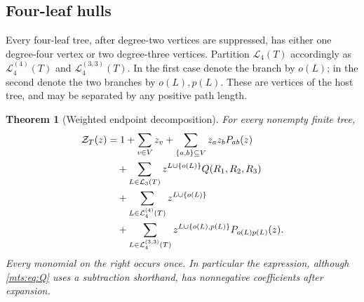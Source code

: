 \documentclass[11pt]{article}
\numberwithin{equation}{section}
\newtheorem{theorem}{Theorem}[section]
\theoremstyle{definition}
\newcommand{\Zpoly}{\mathcal Z}
\begin{document}
\subsection{Four-leaf hulls}

Every four-leaf tree, after degree-two vertices are suppressed, has either
one degree-four vertex or two degree-three vertices. Partition
$\mathcal L_4(T)$ accordingly as $\mathcal L_4^{(4)}(T)$ and
$\mathcal L_4^{(3,3)}(T)$. In the first case denote the branch by $o(L)$;
in the second denote the two branches by $o(L),p(L)$. These are vertices
of the host tree, and may be separated by any positive path length.

\begin{theorem}[Weighted endpoint decomposition]\label{mts:thm:enumerator}
For every nonempty finite tree,
\begin{align}
 \Zpoly_T(z)
 &=1+\sum_{v\in V}z_v
   +\sum_{\{a,b\}\subseteq V}z_a z_b P_{ab}(z)\notag\\
 &\quad+\sum_{L\in\mathcal L_3(T)}
            z^{L\cup\{o(L)\}}Q(R_1,R_2,R_3)\notag\\
 &\quad+\sum_{L\in\mathcal L_4^{(4)}(T)}z^{L\cup\{o(L)\}}\notag\\
 &\quad+\sum_{L\in\mathcal L_4^{(3,3)}(T)}
            z^{L\cup\{o(L),p(L)\}}P_{o(L)p(L)}(z).
 \label{mts:eq:enumerator}
\end{align}
Every monomial on the right occurs once. In particular the expression,
although \eqref{mts:eq:Q} uses a subtraction shorthand, has nonnegative
coefficients after expansion.
\end{theorem}
\end{document}
